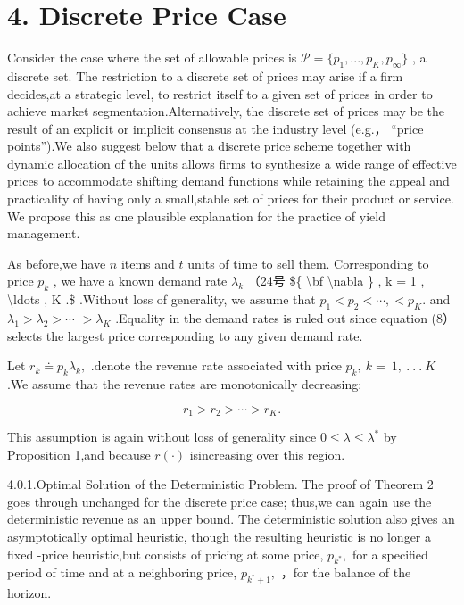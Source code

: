 \section{4. Discrete Price Case}\label{discrete-price-case}

Consider the case where the set of allowable prices is
\(\mathcal { P } = \{ p _ { 1 } , . . . , p _ { K } , p _ { \infty } \}\)
, a discrete set. The restriction to a discrete set of prices may arise
if a firm decides,at a strategic level, to restrict itself to a given
set of prices in order to achieve market segmentation.Alternatively, the
discrete set of prices may be the result of an explicit or implicit
consensus at the industry level (e.g.， ``price points'').We also
suggest below that a discrete price scheme together with dynamic
allocation of the units allows firms to synthesize a wide range of
effective prices to accommodate shifting demand functions while
retaining the appeal and practicality of having only a small,stable set
of prices for their product or service. We propose this as one plausible
explanation for the practice of yield management.

As before,we have \(n\) items and \(t\) units of time to sell them.
Corresponding to price \(p _ { k }\) , we have a known demand rate
\({ \lambda } _ { k }\) （24号 {\$\{ \textbackslash bf
\textbackslash nabla \} , k = 1 , \textbackslash ldots , K .\$} .Without
loss of generality, we assume that
\(p _ { 1 } < p _ { 2 } < \cdots , < p _ { K } .\) and
\(\lambda _ { 1 } > \lambda _ { 2 } > \cdots\) \(> \lambda _ { K }\)
.Equality in the demand rates is ruled out since equation (8） selects
the largest price corresponding to any given demand rate.

Let \(r _ { k } \doteq p _ { k } \lambda _ { k } ,\) .denote the revenue
rate associated with price \(p _ { k } , \ k = \ 1 , \ . \ . \ . \ K\)
.We assume that the revenue rates are monotonically decreasing:

\[
r _ { 1 } > r _ { 2 } > \cdots > r _ { K } .
\]

This assumption is again without loss of generality since
\(0 \leq \lambda \leq \lambda ^ { * }\) by Proposition 1,and because
\(r ( \cdot )\) isincreasing over this region.

4.0.1.Optimal Solution of the Deterministic Problem. The proof of
Theorem 2 goes through unchanged for the discrete price case; thus,we
can again use the deterministic revenue as an upper bound. The
deterministic solution also gives an asymptotically optimal heuristic,
though the resulting heuristic is no longer a fixed -price heuristic,but
consists of pricing at some price, \(p _ { k ^ { * } } ,\) for a
specified period of time and at a neighboring price,
\(p _ { k ^ { * } + 1 } ,\) ，for the balance of the horizon.

